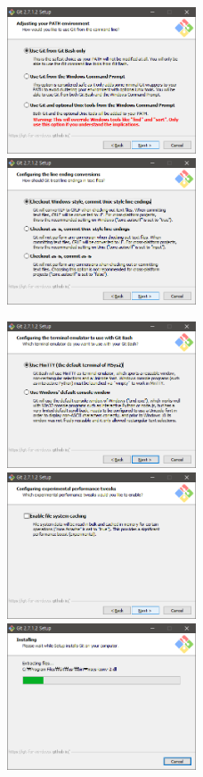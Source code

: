 \documentclass[11pt
  , a4paper
  , article
  , oneside
]{memoir}
\begin{document}
\begin{itemize}
\begin{figure}[!htb]
{		}
		\subbottom
		{
			\includegraphics[width=0.5\textwidth]{./images/gitinstall6.PNG}%
			\includegraphics[width=0.5\textwidth]{./images/gitinstall7.PNG}   
		}
	\end{figure}	
	\clearpage
	\begin{figure}[!htb]
		\centering	
		\subbottom
		{
			\includegraphics[width=0.5\textwidth]{./images/gitinstall8.PNG}%
			\includegraphics[width=0.5\textwidth]{./images/gitinstall9.PNG}   
		}
		\subbottom
		{
			\includegraphics[width=0.5\textwidth]{./images/gitinstall10.PNG}%
}
\end{figure}
\end{itemize}
\end{document}

